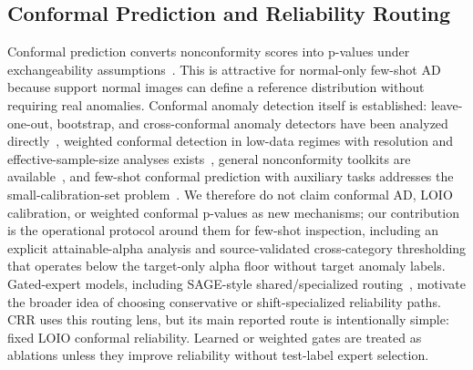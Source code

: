 \subsection{Conformal Prediction and Reliability Routing}
Conformal prediction converts nonconformity scores into p-values under exchangeability assumptions~\cite{vovk2005,shafer2008tutorial,angelopoulos2021gentle}. This is attractive for normal-only few-shot AD because support normal images can define a reference distribution without requiring real anomalies. Conformal anomaly detection itself is established: leave-one-out, bootstrap, and cross-conformal anomaly detectors have been analyzed directly~\cite{hennhofer2024loio}, weighted conformal detection in low-data regimes with resolution and effective-sample-size analyses exists~\cite{hennhofer2026weighted}, general nonconformity toolkits are available~\cite{hennhofer2026nonconform}, and few-shot conformal prediction with auxiliary tasks addresses the small-calibration-set problem~\cite{fisch2021fewshot}. We therefore do not claim conformal AD, LOIO calibration, or weighted conformal p-values as new mechanisms; our contribution is the operational protocol around them for few-shot inspection, including an explicit attainable-alpha analysis and source-validated cross-category thresholding that operates below the target-only alpha floor without target anomaly labels. Gated-expert models, including SAGE-style shared/specialized routing~\cite{Thai_2026_CVPR}, motivate the broader idea of choosing conservative or shift-specialized reliability paths. CRR uses this routing lens, but its main reported route is intentionally simple: fixed LOIO conformal reliability. Learned or weighted gates are treated as ablations unless they improve reliability without test-label expert selection.
